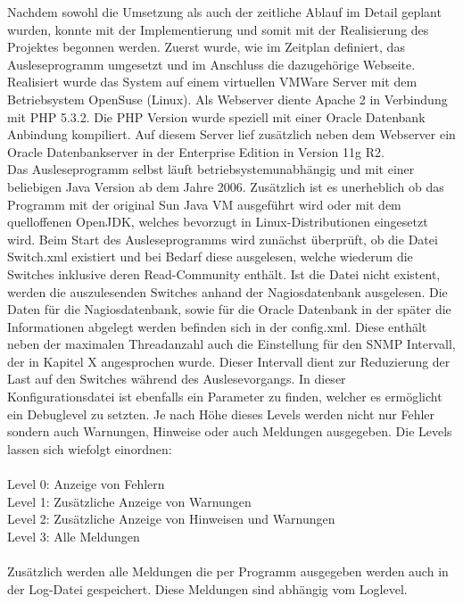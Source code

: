 Nachdem sowohl die Umsetzung als auch der zeitliche Ablauf im Detail geplant wurden, konnte mit der Implementierung und somit mit der Realisierung des Projektes begonnen werden.
Zuerst wurde, wie im Zeitplan definiert, das Ausleseprogramm umgesetzt und im Anschluss die dazugehörige Webseite.\\
Realisiert wurde das System auf einem virtuellen VMWare Server mit dem Betriebsystem OpenSuse (Linux). Als Webserver diente Apache 2 in Verbindung mit PHP 5.3.2. Die PHP Version wurde speziell mit einer Oracle Datenbank Anbindung kompiliert.
Auf diesem Server lief zusätzlich neben dem Webserver ein Oracle Datenbankserver in der Enterprise Edition in Version 11g R2.\\
Das Ausleseprogramm selbst läuft betriebsystemunabhängig und mit einer beliebigen Java Version ab dem Jahre 2006. Zusätzlich ist es unerheblich ob das Programm mit der original Sun Java VM ausgeführt wird oder mit dem quelloffenen OpenJDK, welches bevorzugt in Linux-Distributionen eingesetzt wird.
Beim Start des Ausleseprogramms wird zunächst überprüft, ob die Datei Switch.xml existiert und bei Bedarf diese ausgelesen, welche wiederum die Switches inklusive deren Read-Community enthält. Ist die Datei nicht existent, werden die auszulesenden Switches anhand der Nagiosdatenbank ausgelesen. Die Daten für die Nagiosdatenbank, sowie für die Oracle Datenbank in der später die Informationen abgelegt werden befinden sich in der config.xml. Diese enthält neben der maximalen Threadanzahl auch die Einstellung für den SNMP Intervall, der in Kapitel X angesprochen wurde. Dieser Intervall dient zur Reduzierung der Last auf den Switches während des Auslesevorgangs. In dieser Konfigurationsdatei ist ebenfalls ein Parameter zu finden, welcher es ermöglicht ein Debuglevel zu setzten. Je nach Höhe dieses Levels werden nicht nur Fehler sondern auch Warnungen, Hinweise oder auch Meldungen ausgegeben. Die Levels lassen sich wiefolgt einordnen:\\
\\
Level 0: Anzeige von Fehlern\\
Level 1: Zusätzliche Anzeige von Warnungen\\
Level 2: Zusätzliche Anzeige von Hinweisen und Warnungen\\
Level 3: Alle Meldungen\\
\\
Zusätzlich werden alle Meldungen die per Programm ausgegeben werden auch in der Log-Datei gespeichert. Diese Meldungen sind abhängig vom Loglevel.
\\
